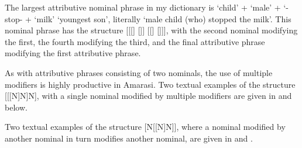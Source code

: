 The largest attributive nominal phrase in my dictionary is
 `child' +  `male' + \mbox{} `{\at}-stop-{\at}
+  `milk' {\ra}  `youngest son',
literally `male child (who) stopped the milk'.
This nominal phrase has the structure [[[] []] [[] []]],
with the second nominal modifying the first,
the fourth modifying the third, and the final attributive
phrase modifying the first attributive phrase.

\newpage
As with attributive phrases consisting of two nominals,
the use of multiple modifiers is highly productive in Amarasi.
Two textual examples of the structure [[[N]N]N],
with a single nominal modified by multiple modifiers
are given in  and  below.

\begin{exe}
	\label{ex:130907-3, 12.15}
	\label{ex:120715-2, 0.25}
\end{exe}

Two textual examples of the structure [N[[N]N]],
where a nominal modified by another nominal in turn modifies another nominal,
are given in  and .

